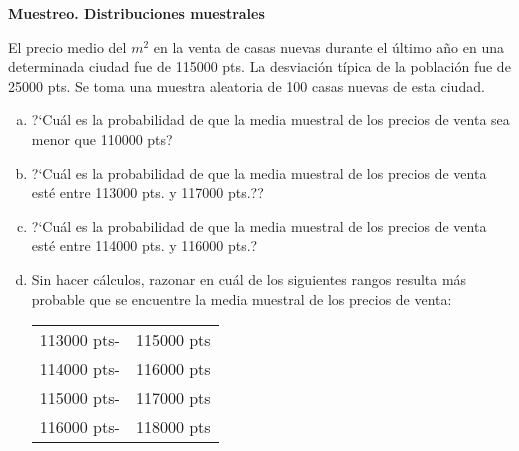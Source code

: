 \documentclass[12pt]{article}
\begin{document}

\newpage

\textbf{Muestreo. Distribuciones muestrales}

\begin{prob}
    El precio medio del $m^2$ en  la venta de casas nuevas durante el último año
    en una determinada ciudad  fue de 115000 pts. La desviación
    típica de la población fue de 25000 pts. Se toma una muestra
    aleatoria de 100 casas nuevas de esta ciudad.
    \begin{enumerate}[a)]
        \item ?`Cuál es la probabilidad de que la media muestral de los
        precios de venta sea menor que 110000 pts?
        \item ?`Cuál es la probabilidad de que la media muestral de los
        precios de venta esté entre 113000 pts. y 117000 pts.??
        \item?`Cuál es la probabilidad de que la media muestral de los
        precios de venta esté entre 114000 pts. y 116000 pts.?
        \item Sin hacer cálculos, razonar en cuál de los siguientes rangos
        resulta más probable que se encuentre la media muestral de los
        precios de venta:\break
        \begin{center}
        \begin{tabular}{ll}
        113000 pts-&115000 pts\\
        114000 pts-&116000 pts\\
        115000 pts-&117000 pts\\
        116000 pts-&118000 pts
            \end{tabular}

            \end{center}
        \end{enumerate}
    \end{prob}
\end{document}
